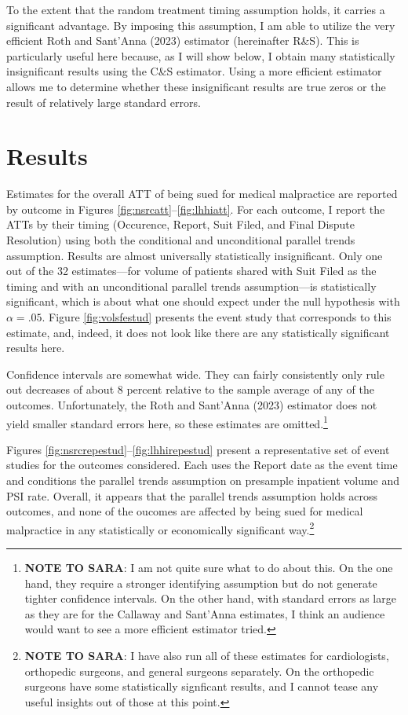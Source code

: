 \documentclass[
  12pt,
]{article}
\begin{document}
To the extent that the random treatment timing assumption holds, it carries a significant advantage. By imposing this assumption, I am able to utilize the very efficient Roth and Sant'Anna (2023) estimator (hereinafter R\&S). This is particularly useful here because, as I will show below, I obtain many statistically insignificant results using the C\&S estimator. Using a more efficient estimator allows me to determine whether these insignificant results are true zeros or the result of relatively large standard errors.

\hypertarget{results}{%
\section{Results}\label{results}}

Estimates for the overall ATT of being sued for medical malpractice are reported by outcome in Figures \ref{fig:nsrcatt}--\ref{fig:lhhiatt}. For each outcome, I report the ATTs by their timing (Occurence, Report, Suit Filed, and Final Dispute Resolution) using both the conditional and unconditional parallel trends assumption. Results are almost universally statistically insignificant. Only one out of the 32 estimates---for volume of patients shared with Suit Filed as the timing and with an unconditional parallel trends assumption---is statistically significant, which is about what one should expect under the null hypothesis with \(\alpha=.05\). Figure \ref{fig:volsfestud} presents the event study that corresponds to this estimate, and, indeed, it does not look like there are any statistically significant results here.

Confidence intervals are somewhat wide. They can fairly consistently only rule out decreases of about 8 percent relative to the sample average of any of the outcomes. Unfortunately, the Roth and Sant'Anna (2023) estimator does not yield smaller standard errors here, so these estimates are omitted.\footnote{\textbf{NOTE TO SARA}: I am not quite sure what to do about this. On the one hand, they require a stronger identifying assumption but do not generate tighter confidence intervals. On the other hand, with standard errors as large as they are for the Callaway and Sant'Anna estimates, I think an audience would want to see a more efficient estimator tried.}

Figures \ref{fig:nsrcrepestud}--\ref{fig:lhhirepestud} present a representative set of event studies for the outcomes considered. Each uses the Report date as the event time and conditions the parallel trends assumption on presample inpatient volume and PSI rate. Overall, it appears that the parallel trends assumption holds across outcomes, and none of the oucomes are affected by being sued for medical malpractice in any statistically or economically significant way.\footnote{\textbf{NOTE TO SARA}: I have also run all of these estimates for cardiologists, orthopedic surgeons, and general surgeons separately. On the orthopedic surgeons have some statistically signficant results, and I cannot tease any useful insights out of those at this point.}
\end{document}
